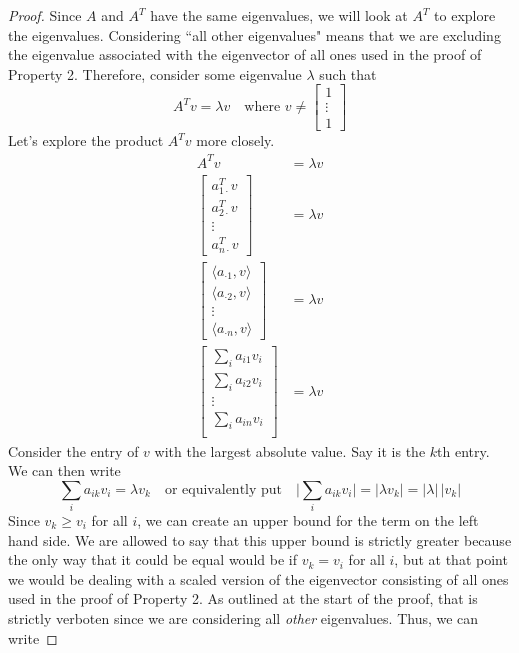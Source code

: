 \documentclass[10pt]{article}
\begin{document}
\begin{proof}
Since $A$ and $A^T$ have the same eigenvalues, we will look at $A^T$ to explore the eigenvalues. Considering ``all other eigenvalues" means that we are excluding the eigenvalue associated with the eigenvector of all ones used in the proof of Property 2. Therefore, consider some eigenvalue $\lambda$ such that
\[A^Tv = \lambda v\quad\text{where }v\neq \left[\begin{array}{c}
     1\\
     \vdots\\
     1
\end{array}\right]\]
Let's explore the product $A^Tv$ more closely.
\begin{align*}
    A^T v &= \lambda v\\
    \left[\begin{array}{c}
         a^T_{1\cdot}v\\[4pt]
         a^T_{2\cdot}v\\
         \vdots\\
         a^T_{n\cdot}v
    \end{array}\right] &= \lambda v\\
    \left[\begin{array}{c}
         \langle a_{\cdot1},v\rangle\\[4pt]
         \langle a_{\cdot2},v\rangle\\
         \vdots\\
         \langle a_{\cdot n},v\rangle
    \end{array}\right] &= \lambda v\\
    \left[\begin{array}{cc}
         \sum_i a_{i1} v_i\\
         \sum_i a_{i2} v_i\\
         \vdots\\
         \sum_i a_{in} v_i\\
    \end{array}\right] &= \lambda v
\end{align*}
Consider the entry of $v$ with the largest absolute value. Say it is the $k$th entry. We can then write
\[\sum_{i} a_{ik} v_i = \lambda v_k \quad\text{or equivalently put}\quad \Big|\sum_{i} a_{ik} v_i\Big| = |\lambda v_k| = |\lambda|\,|v_k|\]
Since $v_k\geq v_i$ for all $i$, we can create an upper bound for the term on the left hand side. We are allowed to say that this upper bound is strictly greater because the only way that it could be equal would be if $v_k=v_i$ for all $i$, but at that point we would be dealing with a scaled version of the eigenvector consisting of all ones used in the proof of Property 2. As outlined at the start of the proof, that is strictly verboten since we are considering all \textit{other} eigenvalues. Thus, we can write

\end{proof}
\end{document}
